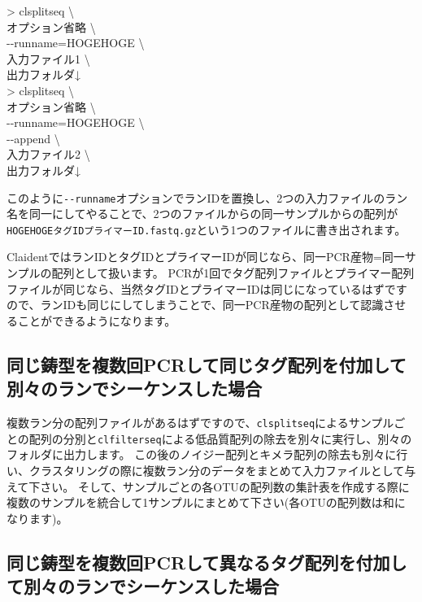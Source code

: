 \documentclass[titlepage,10pt,a4paper]{jsbook}
\newenvironment{cmd}{\begin{oframed}\raggedright\ttfamily\footnotesize\setlength{\baselineskip}{1.4em}}{\end{oframed}\vspace{-1em}}
\begin{document}
\begin{cmd}
{\textgreater} clsplitseq {\textbackslash}\\
オプション省略 {\textbackslash}\\
{-}{-}runname=HOGEHOGE {\textbackslash}\\
入力ファイル1 {\textbackslash}\\
出力フォルダ↓\\
{\textgreater} clsplitseq {\textbackslash}\\
オプション省略 {\textbackslash}\\
{-}{-}runname=HOGEHOGE {\textbackslash}\\
{-}{-}append {\textbackslash}\\
入力ファイル2 {\textbackslash}\\
出力フォルダ↓
\end{cmd}

このように\texttt{{-}{-}runname}オプションでランIDを置換し、2つの入力ファイルのラン名を同一にしてやることで、2つのファイルからの同一サンプルからの配列が\texttt{HOGEHOGE{\textunderscore}{\textunderscore}タグID{\textunderscore}{\textunderscore}プライマーID.fastq.gz}という1つのファイルに書き出されます。

ClaidentではランIDとタグIDとプライマーIDが同じなら、同一PCR産物=同一サンプルの配列として扱います。
PCRが1回でタグ配列ファイルとプライマー配列ファイルが同じなら、当然タグIDとプライマーIDは同じになっているはずですので、ランIDも同じにしてしまうことで、同一PCR産物の配列として認識させることができるようになります。

\subsection{同じ鋳型を複数回PCRして同じタグ配列を付加して別々のランでシーケンスした場合}

複数ラン分の配列ファイルがあるはずですので、\texttt{clsplitseq}によるサンプルごとの配列の分別と\texttt{clfilterseq}による低品質配列の除去を別々に実行し、別々のフォルダに出力します。
この後のノイジー配列とキメラ配列の除去も別々に行い、クラスタリングの際に複数ラン分のデータをまとめて入力ファイルとして与えて下さい。
そして、サンプルごとの各OTUの配列数の集計表を作成する際に複数のサンプルを統合して1サンプルにまとめて下さい(各OTUの配列数は和になります)。

\subsection{同じ鋳型を複数回PCRして異なるタグ配列を付加して別々のランでシーケンスした場合}
\end{document}
